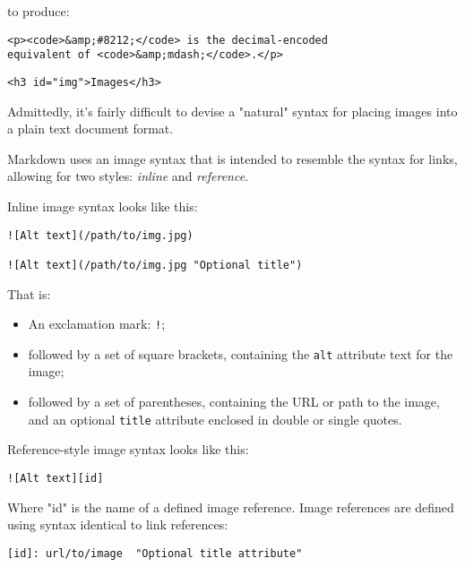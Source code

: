 to produce:

\begin{lstlisting}
<p><code>&amp;#8212;</code> is the decimal-encoded
equivalent of <code>&amp;mdash;</code>.</p>
\end{lstlisting}


\begin{lstlisting}<h3 id="img">Images</h3>\end{lstlisting}




Admittedly, it's fairly difficult to devise a "natural" syntax for
placing images into a plain text document format.



Markdown uses an image syntax that is intended to resemble the syntax
for links, allowing for two styles: \emph{inline} and \emph{reference}.



Inline image syntax looks like this:

\begin{lstlisting}
![Alt text](/path/to/img.jpg)

![Alt text](/path/to/img.jpg "Optional title")
\end{lstlisting}




That is:

\begin{itemize}
\item An exclamation mark: \texttt{!};
\item followed by a set of square brackets, containing the \texttt{alt}
attribute text for the image;
\item followed by a set of parentheses, containing the URL or path to
the image, and an optional \texttt{title} attribute enclosed in double
or single quotes.
\end{itemize}




Reference-style image syntax looks like this:

\begin{lstlisting}
![Alt text][id]
\end{lstlisting}




Where "id" is the name of a defined image reference. Image references
are defined using syntax identical to link references:

\begin{lstlisting}
[id]: url/to/image  "Optional title attribute"
\end{lstlisting}




